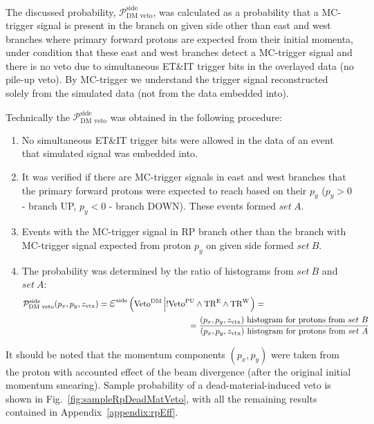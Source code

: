 The discussed probability, $\mathcal{P}_{\text{DM~veto}}^{\text{side}}$, was calculated as a probability that a MC-trigger signal is present in the branch on given side other than east and west branches where primary forward protons are expected from their initial momenta, under condition that these east and west branches detect a MC-trigger signal and there is no veto due to simultaneous ET\&IT trigger bits in the overlayed data (no pile-up veto). By MC-trigger we understand the trigger signal reconstructed solely from the simulated data (not from the data embedded into).

Technically the $\mathcal{P}_{\text{DM~veto}}^{\text{side}}$ was obtained in the following procedure:
\begin{enumerate}
  \item No simultaneous ET\&IT trigger bits were allowed in the data of an event that simulated signal was embedded into.
	\item It was verified if there are MC-trigger signals in east and west branches that the primary forward protons were expected to reach based on their $p_{y}$ ($p_{y}>0$ - branch UP, $p_{y}<0$ - branch DOWN). These events formed $set~A$.
	\item Events with the MC-trigger signal in RP branch other than the branch with MC-trigger signal expected from proton $p_{y}$ on given side formed $set~B$.
	\item The probability was determined by the ratio of histograms from $set~B$ and $set~A$:
	\begin{equation}\label{eq:rpDeadMatProb}
	\begin{split}
 \mathcal{P}_{\text{DM~veto}}^{\text{side}}(p_{x}, p_{y}, z_{\text{vtx}}) = \mbox{\LARGE$\varepsilon$}^{\text{side}}\left(\Vdm\left|!\Vpu\land\TRE\land\TRW\right.\right) = ~~~~~~~~~~~~~~~~~~~~~~~~~~~~~~~~~~~~~~\\~~~~~~~~~~~~~~~~~~~~~~~~~~~~~~~ =%
 \frac{(p_{x}, p_{y}, z_{\text{vtx}})~\text{histogram for protons from}~set~B}{(p_{x}, p_{y}, z_{\text{vtx}})~\text{histogram for protons from}~set~A}
 \end{split}
  \end{equation}
	
\end{enumerate}

It should be noted that the momentum components $(p_{x}, p_{y})$ were taken from the proton with accounted effect of the beam divergence (after the original initial momentum smearing). Sample probability of a dead-material-induced veto is shown in Fig.~\ref{fig:sampleRpDeadMatVeto}, with all the remaining results contained in Appendix~\ref{appendix:rpEff}.

